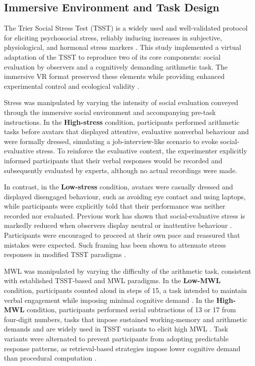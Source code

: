 \documentclass[lettersize,journal]{IEEEtran}
\begin{document}
\subsection{Immersive Environment and Task Design}
\label{sec:immersive_env_task}
The Trier Social Stress Test (TSST) is a widely used and well-validated protocol for eliciting psychosocial stress, reliably inducing increases in subjective, physiological, and hormonal stress markers \cite{goodmanMetaanalyticalAssessmentEffects2017, vanhollebekeNeuralCorrelatesPsychosocial2022a}. This study implemented a virtual adaptation of the TSST to reproduce two of its core components: social evaluation by observers and a cognitively demanding arithmetic task. The immersive VR format preserved these elements while providing enhanced experimental control and ecological validity \cite{helminenStressReactivityTrier2021}.

Stress was manipulated by varying the intensity of social evaluation conveyed through the immersive social environment and accompanying pre-task instructions. In the \textbf{High-stress} condition, participants performed arithmetic tasks before avatars that displayed attentive, evaluative nonverbal behaviour and were formally dressed, simulating a job-interview-like scenario to evoke social-evaluative stress. To reinforce the evaluative context, the experimenter explicitly informed participants that their verbal responses would be recorded and subsequently evaluated by experts, although no actual recordings were made. 

In contrast, in the \textbf{Low-stress} condition, avatars were casually dressed and displayed disengaged behaviour, such as avoiding eye contact and using laptops, while participants were explicitly told that their performance was neither recorded nor evaluated. Previous work has shown that social-evaluative stress is markedly reduced when observers display neutral or inattentive behaviour \cite{yeImpactAudienceDynamics2024}. Participants were encouraged to proceed at their own pace and reassured that mistakes were expected. Such framing has been shown to attenuate stress responses in modified TSST paradigms \cite{wiemersFriendlyVersionTrier2013}.

MWL was manipulated by varying the difficulty of the arithmetic task, consistent with established TSST-based and MWL paradigms. In the \textbf{Low-MWL} condition, participants counted aloud in steps of 15, a task intended to maintain verbal engagement while imposing minimal cognitive demand \cite{guezEffectTrierSocial2016}. In the \textbf{High-MWL} condition, participants performed serial subtractions of 13 or 17 from four-digit numbers, tasks that impose sustained working-memory and arithmetic demands and are widely used in TSST variants to elicit high MWL \cite{giannakakisReviewPsychologicalStress2022}. Task variants were alternated to prevent participants from adopting predictable response patterns, as retrieval-based strategies impose lower cognitive demand than procedural computation \cite{sokolowskiNeuralCorrelatesRetrieval2023}.
\end{document}
